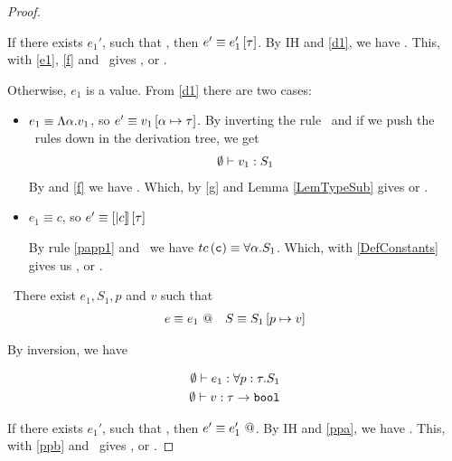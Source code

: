 \begin{proof}
\begin{itemize}
If there exists $e_1'$, such that , 
then $e' \equiv {e_1'} \left[ {\tau}\right]$.
By IH and \ref{d1}, we have .
This, with \ref{e1}, \ref{f} and \tinst\ 
gives , or
.

Otherwise, $e_1$ is a value. From \ref{d1} there are two cases:

\begin{itemize}
\item $e_1 \equiv \Lambda \alpha . v_{1}$, so $e' \equiv v_1 \left[ \alpha \mapsto \tau \right] $.
By inverting the rule \tgen\ and if we push the \tsub\ rules down in the derivation tree,
we get 
\begin{align}
\emptyset \vdash v_1 : S_1 \label{g}
\end{align}
By \wstExt and \ref{f} we have .
Which, by \ref{g} and Lemma \ref{LemTypeSub} gives 
 or
.
 
\item $e_1 \equiv c$, 
so $e' \equiv {[|c|]} \left[ {\tau}\right]$
			
			By rule \ref{papp1} and \tconst \ we have 
			$tc\left(\texttt{c}\right) \equiv \forall \alpha . S_1$.
			Which, with \ref{DefConstants} gives us 
			, or 
			. 
\end{itemize}

\end{itemize}



\item \tpinst\ There exist $e_1, S_1, p$ and $v$ such that
\begin{align*}
e \equiv {e_1} \ @ && S \equiv S_1 \left[ p \mapsto v \right] 
\end{align*}

By inversion, we have

\begin{align}
\emptyset \vdash e_1 : \forall p : \tau . S_1 \label{ppa}\\
\emptyset \vdash v : \tau \rightarrow \texttt{bool} \label{ppb}
\end{align} 

If there exists $e_1'$, such that , 
then $e' \equiv {e_1'} \ @$.
By IH and \ref{ppa}, we have .
This, with \ref{ppb} and \tpinst\ 
gives , or
\hastypeEmp{e'}{S}.


\end{proof}
